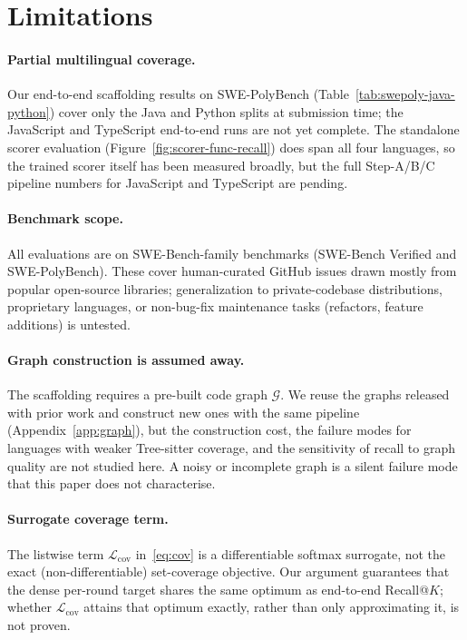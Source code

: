 \section*{Limitations}
\label{sec:limitations}

\paragraph{Partial multilingual coverage.}
Our end-to-end scaffolding results on SWE-PolyBench
(Table~\ref{tab:swepoly-java-python}) cover only the Java and
Python splits at submission time; the JavaScript and TypeScript
end-to-end runs are not yet complete. The standalone scorer
evaluation (Figure~\ref{fig:scorer-func-recall}) does span all
four languages, so the trained scorer itself has been measured
broadly, but the full Step-A/B/C pipeline numbers for
JavaScript and TypeScript are pending.

\paragraph{Benchmark scope.}
All evaluations are on SWE-Bench-family benchmarks
(SWE-Bench Verified and SWE-PolyBench). These cover
human-curated GitHub issues drawn mostly from popular
open-source libraries; generalization to private-codebase
distributions, proprietary languages, or non-bug-fix
maintenance tasks (refactors, feature additions) is untested.

\paragraph{Graph construction is assumed away.}
The scaffolding requires a pre-built code graph $\mathcal{G}$.
We reuse the graphs released with prior work and construct new
ones with the same pipeline (Appendix~\ref{app:graph}), but the
construction cost, the failure modes for languages with weaker
Tree-sitter coverage, and the sensitivity of recall to graph
quality are not studied here. A noisy or incomplete graph is a
silent failure mode that this paper does not characterise.

\paragraph{Surrogate coverage term.}
The listwise term $\mathcal{L}_{\text{cov}}$ in~\eqref{eq:cov}
is a differentiable softmax surrogate, not the exact
(non-differentiable) set-coverage objective. Our argument
guarantees that the dense per-round target shares the same
optimum as end-to-end Recall@$K$; whether $\mathcal{L}_{\text{cov}}$
attains that optimum exactly, rather than only approximating it,
is not proven.

